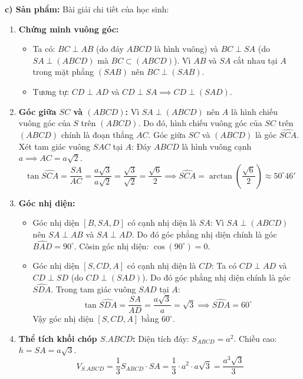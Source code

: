 \documentclass[12pt, a4paper]{article}
\begin{document}
\noindent \textbf{c) Sản phẩm:}
Bài giải chi tiết của học sinh:
\begin{enumerate}[label=\alph*)]
    \item \textbf{Chứng minh vuông góc:}
    \begin{itemize}
        \item Ta có: $BC \perp AB$ (do đáy $ABCD$ là hình vuông) và $BC \perp SA$ (do $SA \perp (ABCD)$ mà $BC \subset (ABCD)$).
        Vì $AB$ và $SA$ cắt nhau tại $A$ trong mặt phẳng $(SAB)$ nên $BC \perp (SAB)$.
        \item Tương tự: $CD \perp AD$ và $CD \perp SA \implies CD \perp (SAD)$.
    \end{itemize}

    \item \textbf{Góc giữa $SC$ và $(ABCD)$:}
    Vì $SA \perp (ABCD)$ nên $A$ là hình chiếu vuông góc của $S$ trên $(ABCD)$.
    Do đó, hình chiếu vuông góc của $SC$ trên $(ABCD)$ chính là đoạn thẳng $AC$.
    Góc giữa $SC$ và $(ABCD)$ là góc $\widehat{SCA}$.
    Xét tam giác vuông $SAC$ tại $A$:
    Đáy $ABCD$ là hình vuông cạnh $a \implies AC = a\sqrt{2}$.
    $$\tan\widehat{SCA} = \dfrac{SA}{AC} = \dfrac{a\sqrt{3}}{a\sqrt{2}} = \dfrac{\sqrt{3}}{\sqrt{2}} = \dfrac{\sqrt{6}}{2} \implies \widehat{SCA} = \arctan\left(\dfrac{\sqrt{6}}{2}\right) \approx 50^\circ 46'$$

    \item \textbf{Góc nhị diện:}
    \begin{itemize}
        \item Góc nhị diện $[B, SA, D]$ có cạnh nhị diện là $SA$:
        Vì $SA \perp (ABCD)$ nên $SA \perp AB$ và $SA \perp AD$.
        Do đó góc phẳng nhị diện chính là góc $\widehat{BAD} = 90^\circ$. Côsin góc nhị diện: $\cos(90^\circ) = 0$.
        \item Góc nhị diện $[S, CD, A]$ có cạnh nhị diện là $CD$:
        Ta có $CD \perp AD$ và $CD \perp SD$ (do $CD \perp (SAD)$).
        Do đó góc phẳng nhị diện chính là góc $\widehat{SDA}$.
        Trong tam giác vuông $SAD$ tại $A$:
        $$\tan\widehat{SDA} = \dfrac{SA}{AD} = \dfrac{a\sqrt{3}}{a} = \sqrt{3} \implies \widehat{SDA} = 60^\circ$$
        Vậy góc nhị diện $[S, CD, A]$ bằng $60^\circ$.
    \end{itemize}

    \item \textbf{Thể tích khối chóp $S.ABCD$:}
    Diện tích đáy: $S_{ABCD} = a^2$. Chiều cao: $h = SA = a\sqrt{3}$.
    $$V_{S.ABCD} = \dfrac{1}{3} S_{ABCD} \cdot SA = \dfrac{1}{3} \cdot a^2 \cdot a\sqrt{3} = \dfrac{a^3\sqrt{3}}{3}$$


\end{enumerate}
\end{document}
